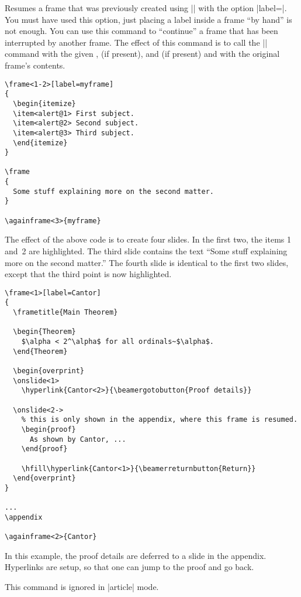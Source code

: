 \begin{command}{\againframe{}}
  \beamernote
  Resumes a frame that was previously created using |\frame| with the option |label=|. You must have used this option, just placing a label inside a frame ``by hand'' is not enough. You can use this command to ``continue'' a frame that has been interrupted by another frame. The effect of this command is to call the |\frame| command with the given ,  (if present), and  (if present) and with the original frame's contents.

  \example
\begin{verbatim}
\frame<1-2>[label=myframe]
{
  \begin{itemize}
  \item<alert@1> First subject.
  \item<alert@2> Second subject.
  \item<alert@3> Third subject.
  \end{itemize}
}

\frame
{
  Some stuff explaining more on the second matter.
}

\againframe<3>{myframe}
\end{verbatim}

  The effect of the above code is to create four slides. In the first two, the items 1 and~2 are highlighted. The third slide contains the text ``Some stuff explaining more on the second matter.'' The fourth slide is identical to the first two slides, except that the third point is now highlighted.

  \example
\begin{verbatim}
\frame<1>[label=Cantor]
{
  \frametitle{Main Theorem}

  \begin{Theorem}
    $\alpha < 2^\alpha$ for all ordinals~$\alpha$.
  \end{Theorem}

  \begin{overprint}
  \onslide<1>
    \hyperlink{Cantor<2>}{\beamergotobutton{Proof details}}

  \onslide<2->
    % this is only shown in the appendix, where this frame is resumed.
    \begin{proof}
      As shown by Cantor, ...
    \end{proof}

    \hfill\hyperlink{Cantor<1>}{\beamerreturnbutton{Return}}
  \end{overprint}
}

...
\appendix

\againframe<2>{Cantor}
\end{verbatim}

  In this example, the proof details are deferred to a slide in the appendix. Hyperlinks are setup, so that one can jump to the proof and go back.

  \articlenote
  This command is ignored in |article| mode.

\end{command}


